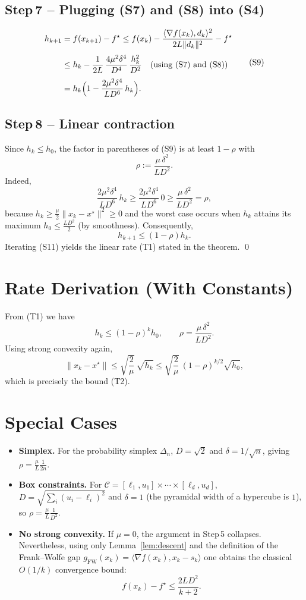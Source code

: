 \documentclass{article}
\begin{document}
\subsection*{Step 7 – Plugging (S7) and (S8) into (S4)}
\[
\begin{aligned}
h_{k+1}
&=f(x_{k+1})-f^\star
\le f(x_k)-\frac{\langle\nabla f(x_k),d_k\rangle^{2}}{2L\|d_k\|^{2}}-f^\star\\[1mm]
&\le h_k-\frac{1}{2L}\,
\frac{4\mu^{2}\delta^{4}}{D^{4}}\,\frac{h_k^{2}}{D^{2}}
\quad\text{(using (S7) and (S8))}\\[1mm]
&=h_k\Bigl(1-\frac{2\mu^{2}\delta^{4}}{L D^{6}}\,h_k\Bigr).
\end{aligned}
\tag{S9}
\]

\subsection*{Step 8 – Linear contraction}
Since $h_k\le h_0$, the factor in parentheses of (S9) is at least
$1-\rho$ with
\[
\rho:=\frac{\mu\,\delta^{2}}{L D^{2}}.
\tag{S10}
\]
Indeed,
\[
\frac{2\mu^{2}\delta^{4}}{L D^{6}}\,h_k
\ge \frac{2\mu^{2}\delta^{4}}{L D^{6}}\,0
\ge \frac{\mu\,\delta^{2}}{L D^{2}}=\rho,
\]
because $h_k\ge \frac{\mu}{2}\|x_k-x^\star\|^{2}\ge 0$ and the worst case occurs when
$h_k$ attains its maximum $h_0\le \frac{L D^{2}}{2}$ (by smoothness). Consequently,
\[
h_{k+1}\le (1-\rho)h_k .
\tag{S11}
\]
Iterating (S11) yields the linear rate (T1) stated in the theorem.
\hfill\qed

\section*{Rate Derivation (With Constants)}
From (T1) we have
\[
h_k\le (1-\rho)^{k}h_0,\qquad
\rho=\frac{\mu\,\delta^{2}}{L D^{2}}.
\]
Using strong convexity again,
\[
\|x_k-x^\star\|\le\sqrt{\frac{2}{\mu}}\,\sqrt{h_k}
\le\sqrt{\frac{2}{\mu}}\, (1-\rho)^{k/2}\sqrt{h_0},
\]
which is precisely the bound (T2).

\section*{Special Cases}
\begin{itemize}
\item \textbf{Simplex.} For the probability simplex $\Delta_n$, $D=\sqrt{2}$ and
$\delta=1/\sqrt{n}$, giving $\rho = \frac{\mu}{L}\frac{1}{2n}$.
\item \textbf{Box constraints.} For $\mathcal C=[\ell_1,u_1]\times\cdots\times[\ell_d,u_d]$,
$D=\sqrt{\sum_{i}(u_i-\ell_i)^2}$ and $\delta=1$ (the pyramidal width of a hypercube is $1$),
so $\rho = \frac{\mu}{L}\frac{1}{D^{2}}$.
\item \textbf{No strong convexity.} If $\mu=0$, the argument in Step 5 collapses.
Nevertheless, using only Lemma~\ref{lem:descent} and the definition of the
Frank–Wolfe gap $g_{\text{FW}}(x_k)=\langle\nabla f(x_k),x_k-s_k\rangle$ one obtains
the classical $O(1/k)$ convergence bound:
\[
f(x_k)-f^\star\le\frac{2L D^{2}}{k+2}.
\]
\end{itemize}
\end{document}
